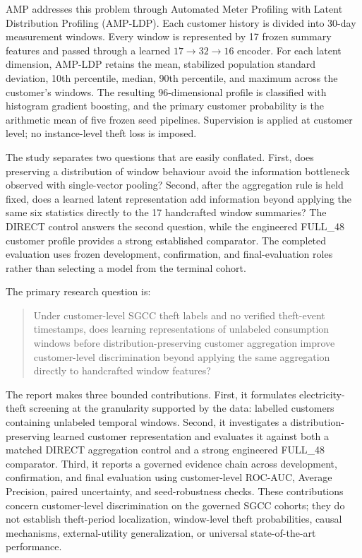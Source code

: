 AMP addresses this problem through Automated Meter Profiling with Latent Distribution Profiling (AMP-LDP). Each customer history is divided into 30-day measurement windows. Every window is represented by 17 frozen summary features and passed through a learned $17\!\rightarrow\!32\!\rightarrow\!16$ encoder. For each latent dimension, AMP-LDP retains the mean, stabilized population standard deviation, 10th percentile, median, 90th percentile, and maximum across the customer's windows. The resulting 96-dimensional profile is classified with histogram gradient boosting, and the primary customer probability is the arithmetic mean of five frozen seed pipelines. Supervision is applied at customer level; no instance-level theft loss is imposed.

The study separates two questions that are easily conflated. First, does preserving a distribution of window behaviour avoid the information bottleneck observed with single-vector pooling? Second, after the aggregation rule is held fixed, does a learned latent representation add information beyond applying the same six statistics directly to the 17 handcrafted window summaries? The DIRECT control answers the second question, while the engineered FULL\_48 customer profile provides a strong established comparator. The completed evaluation uses frozen development, confirmation, and final-evaluation roles rather than selecting a model from the terminal cohort.

The primary research question is:

\begin{quote}
Under customer-level SGCC theft labels and no verified theft-event timestamps, does learning representations of unlabeled consumption windows before distribution-preserving customer aggregation improve customer-level discrimination beyond applying the same aggregation directly to handcrafted window features?
\end{quote}

The report makes three bounded contributions. First, it formulates electricity-theft screening at the granularity supported by the data: labelled customers containing unlabeled temporal windows. Second, it investigates a distribution-preserving learned customer representation and evaluates it against both a matched DIRECT aggregation control and a strong engineered FULL\_48 comparator. Third, it reports a governed evidence chain across development, confirmation, and final evaluation using customer-level ROC-AUC, Average Precision, paired uncertainty, and seed-robustness checks. These contributions concern customer-level discrimination on the governed SGCC cohorts; they do not establish theft-period localization, window-level theft probabilities, causal mechanisms, external-utility generalization, or universal state-of-the-art performance.
